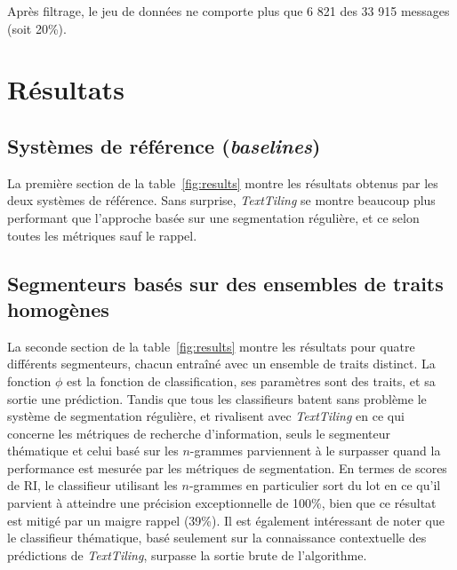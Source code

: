 Après filtrage, le jeu de données ne comporte plus que 6 821 des 33 915 messages (soit 20\%).

\section{Résultats}

\subsection{Systèmes de référence (\textit{baselines})}

La première section de la table~\ref{fig:results} montre les résultats obtenus par les deux systèmes de référence. Sans surprise, \textit{TextTiling} se montre beaucoup plus performant que l'approche basée sur une segmentation régulière, et ce selon toutes les métriques sauf le rappel.

\subsection{Segmenteurs basés sur des ensembles de traits homogènes}

La seconde section de la table~\ref{fig:results} montre les résultats pour quatre différents segmenteurs, chacun entraîné avec un ensemble de traits distinct. La fonction $\phi$ est la fonction de classification, ses paramètres sont des traits, et sa sortie une prédiction. Tandis que tous les classifieurs batent sans problème le système de segmentation régulière, et rivalisent avec \textit{TextTiling} en ce qui concerne les métriques de recherche d'information, seuls le segmenteur thématique et celui basé sur les $n$-grammes parviennent à le surpasser quand la performance est mesurée par les métriques de segmentation. En termes de scores de RI, le classifieur utilisant les $n$-grammes en particulier sort du lot en ce qu'il parvient à atteindre une précision exceptionnelle de 100\%, bien que ce résultat est mitigé par un maigre rappel (39\%). Il est également intéressant de noter que le classifieur thématique, basé seulement sur la connaissance contextuelle des prédictions de \textit{TextTiling}, surpasse la sortie brute de l'algorithme.

